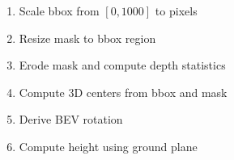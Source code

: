 \begin{enumerate}
    \item Scale bbox from $[0,1000]$ to pixels
    \item Resize mask to bbox region
    \item Erode mask and compute depth statistics
    \item Compute 3D centers from bbox and mask
    \item Derive BEV rotation
    \item Compute height using ground plane
\end{enumerate}
